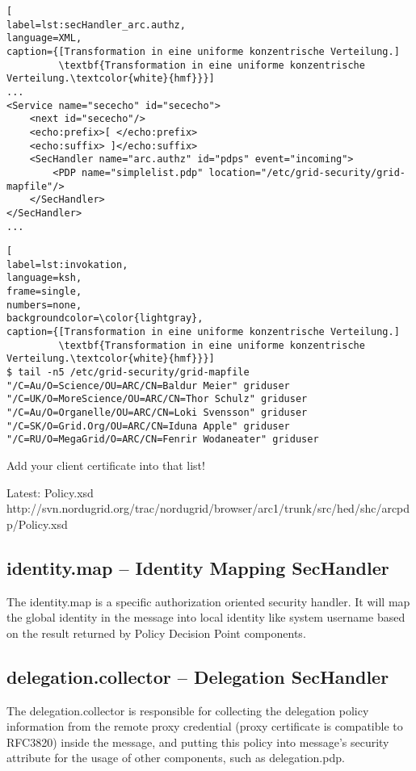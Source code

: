 \begin{minipage}[t]{\textwidth}
\begin{lstlisting}[
label=lst:secHandler_arc.authz,
language=XML,
caption={[Transformation in eine uniforme konzentrische Verteilung.]
         \textbf{Transformation in eine uniforme konzentrische Verteilung.\textcolor{white}{hmf}}}]
...
<Service name="sececho" id="sececho">
	<next id="sececho"/>
	<echo:prefix>[ </echo:prefix>
	<echo:suffix> ]</echo:suffix>
	<SecHandler name="arc.authz" id="pdps" event="incoming">
		<PDP name="simplelist.pdp" location="/etc/grid-security/grid-mapfile"/>
	</SecHandler>
</SecHandler>
...
\end{lstlisting}
\end{minipage}

\begin{lstlisting}[
label=lst:invokation,
language=ksh,
frame=single,
numbers=none,
backgroundcolor=\color{lightgray},
caption={[Transformation in eine uniforme konzentrische Verteilung.]
         \textbf{Transformation in eine uniforme konzentrische Verteilung.\textcolor{white}{hmf}}}]
$ tail -n5 /etc/grid-security/grid-mapfile
"/C=Au/O=Science/OU=ARC/CN=Baldur Meier" griduser
"/C=UK/O=MoreScience/OU=ARC/CN=Thor Schulz" griduser
"/C=Au/O=Organelle/OU=ARC/CN=Loki Svensson" griduser
"/C=SK/O=Grid.Org/OU=ARC/CN=Iduna Apple" griduser
"/C=RU/O=MegaGrid/O=ARC/CN=Fenrir Wodaneater" griduser
\end{lstlisting}
Add your client certificate into that list!

Latest: Policy.xsd
http://svn.nordugrid.org/trac/nordugrid/browser/arc1/trunk/src/hed/shc/arcpdp/Policy.xsd


\subsection{identity.map – Identity Mapping SecHandler}

The identity.map is a specific authorization oriented security handler. It will map the global identity in
the message into local identity like system username based on the result returned by Policy Decision Point
components.


\subsection{delegation.collector – Delegation SecHandler}

The delegation.collector is responsible for collecting the delegation policy information from the remote
proxy credential (proxy certificate is compatible to RFC3820) inside the message, and putting this policy
into message’s security attribute for the usage of other components, such as delegation.pdp.


